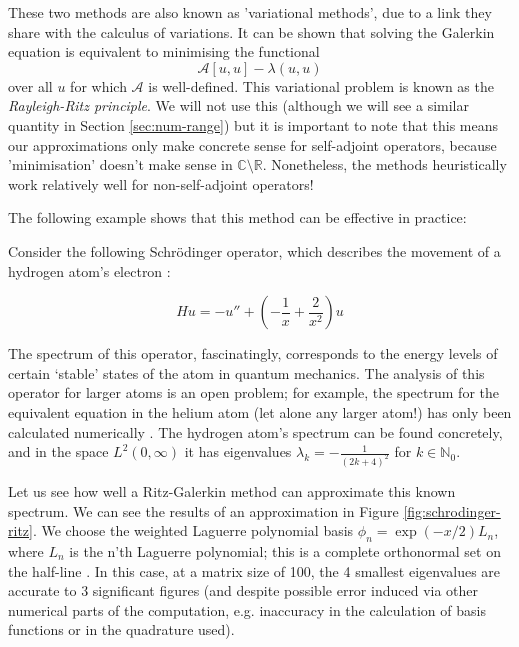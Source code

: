 \documentclass[../main.tex]{subfiles}
\begin{document}
\begin{remark}
These two methods are also known as 'variational methods', due to a link they share with 
the calculus of variations. It can be shown \cite{suli2003introduction} that 
solving the Galerkin equation is equivalent to minimising the functional
$$\mathcal{A}[u, u] - \lambda(u, u)$$
over all $u$ for which $\mathcal{A}$ is well-defined. This variational problem
is known as the \emph{Rayleigh-Ritz principle}. We will not use this (although
we will see a similar quantity in Section \ref{sec:num-range}) but it is important
to note that this means our approximations only make concrete sense for self-adjoint
operators, because 'minimisation' doesn't make sense in $\mathbb{C}\setminus\mathbb{R}$.
Nonetheless, the methods heuristically work relatively well for non-self-adjoint operators!
\end{remark}

The following example shows that this method can be effective in practice:

\begin{example}
\label{ex:schrodinger-ritz}
Consider the following Schr\"odinger operator, which describes the movement of a
hydrogen atom's electron
\cite{pryce1993numerical}:

$$Hu = -u'' + (-\frac{1}{x} + \frac{2}{x^2})u$$
\end{example}

The spectrum of this operator, fascinatingly, corresponds to the energy levels
of certain `stable' states of the atom in quantum mechanics. The analysis of
this operator for larger atoms is an open problem; for example,
the spectrum for the equivalent equation in the helium atom (let alone any
larger atom!) has only been calculated numerically \cite{davies1995spectral}.
The hydrogen atom's spectrum can be found concretely, and in the space $L^2(0,
\infty)$ it has eigenvalues $\lambda_k = -\frac{1}{(2k + 4)^2}$ for $k \in
\mathbb{N}_0$.

Let us see how well a Ritz-Galerkin method can approximate this known spectrum.
We can see the results of an approximation in Figure \ref{fig:schrodinger-ritz}.
We choose the weighted Laguerre
polynomial basis $\phi_n = \exp(-x/2)L_n$, where $L_n$ is the n'th Laguerre
polynomial; this is a complete orthonormal set on the half-line
\cite{szego1975orthogonal}. In this case, at a matrix size of 100, the 4
smallest eigenvalues are accurate to 3 significant figures (and despite possible
error induced via other numerical parts of the computation, e.g. inaccuracy in
the calculation of basis functions or in the quadrature used).
\end{document}
